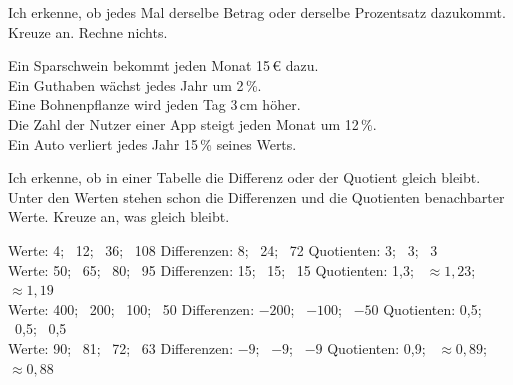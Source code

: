 \setcounter{aufgabe}{12}

\begin{aufgabe}{Ich erkenne, ob jedes Mal derselbe Betrag oder derselbe Prozentsatz dazukommt.}
Kreuze an. Rechne nichts.
\begin{teile}
\teil Ein Sparschwein bekommt jeden Monat 15\,€ dazu. \\ 
\teil Ein Guthaben wächst jedes Jahr um 2\,\%. \\ 
\teil Eine Bohnenpflanze wird jeden Tag 3\,cm höher. \\ 
\teil Die Zahl der Nutzer einer App steigt jeden Monat um 12\,\%. \\ 
\teil Ein Auto verliert jedes Jahr 15\,\% seines Werts. \\ 
\end{teile}
\end{aufgabe}

\begin{aufgabe}{Ich erkenne, ob in einer Tabelle die Differenz oder der Quotient gleich bleibt.}
Unter den Werten stehen schon die Differenzen und die Quotienten benachbarter Werte. Kreuze an, was gleich bleibt.
\begin{teile}
\teil Werte: 4; \ 12; \ 36; \ 108 \quad Differenzen: 8; \ 24; \ 72 \quad Quotienten: 3; \ 3; \ 3 \\ 
\teil Werte: 50; \ 65; \ 80; \ 95 \quad Differenzen: 15; \ 15; \ 15 \quad Quotienten: 1,3; \ $\approx 1{,}23$; \ $\approx 1{,}19$ \\ 
\teil Werte: 400; \ 200; \ 100; \ 50 \quad Differenzen: $-200$; \ $-100$; \ $-50$ \quad Quotienten: 0,5; \ 0,5; \ 0,5 \\ 
\teil Werte: 90; \ 81; \ 72; \ 63 \quad Differenzen: $-9$; \ $-9$; \ $-9$ \quad Quotienten: 0,9; \ $\approx 0{,}89$; \ $\approx 0{,}88$ \\ 
\end{teile}
\end{aufgabe}

